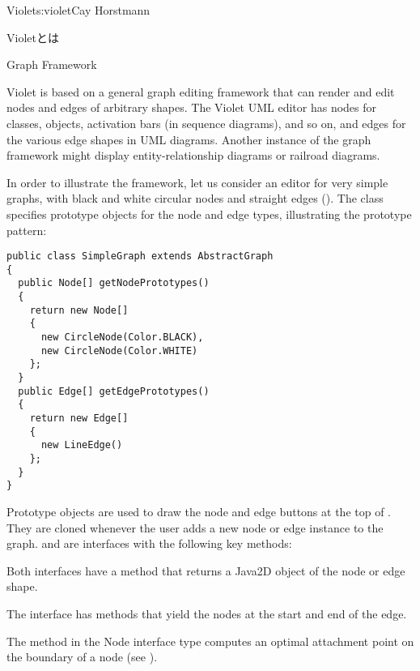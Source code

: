 \begin{aosachapter}{Violet}{s:violet}{Cay Horstmann}
\begin{aosasect1}{Violetとは}
\end{aosasect1}

\begin{aosasect1}{Graph Framework}

Violet is based on a general graph editing framework that can render
and edit nodes and edges of arbitrary shapes. The Violet UML editor
has nodes for classes, objects, activation bars (in sequence
diagrams), and so on, and edges for the various edge shapes in UML
diagrams. Another instance of the graph framework might display
entity-relationship diagrams or railroad diagrams.


In order to illustrate the framework, let us consider an editor for
very simple graphs, with black and white circular nodes and straight
edges ().
The  class specifies prototype objects for the node
and edge types, illustrating the prototype pattern:

\pagebreak

\begin{verbatim}
public class SimpleGraph extends AbstractGraph
{
  public Node[] getNodePrototypes()
  {
    return new Node[] 
    {
      new CircleNode(Color.BLACK),
      new CircleNode(Color.WHITE)
    };
  }
  public Edge[] getEdgePrototypes()
  {
    return new Edge[] 
    {
      new LineEdge()
    };
  }
}
\end{verbatim}

Prototype objects are used to draw the node and edge buttons at the
top of . They are cloned whenever the
user adds a new node or edge instance to the graph.
 and  are interfaces with the following
key methods:

\begin{aosaitemize}

\item Both interfaces have a  method that returns a
  Java2D  object of the node or edge shape.

\item The  interface has methods that yield the nodes at
  the start and end of the edge.

\item The  method in the Node interface type
  computes an optimal attachment point on the boundary of a node (see
  ).


\end{aosaitemize}
\end{aosasect1}
\end{aosachapter}

